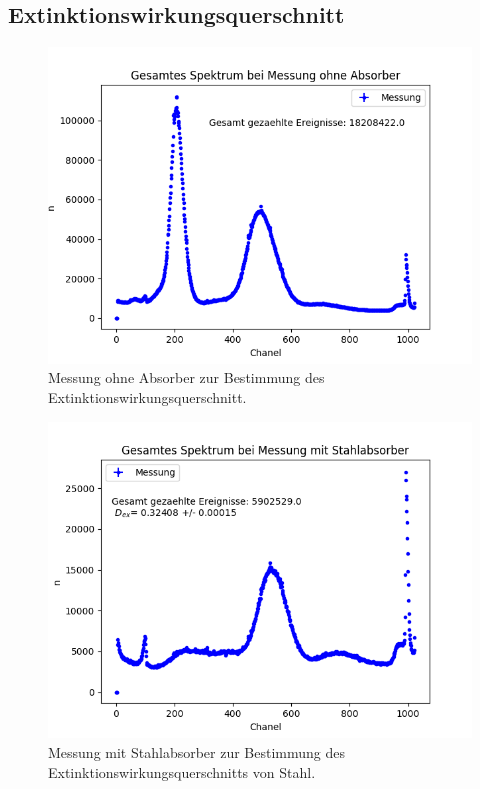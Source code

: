 \documentclass[12pt,a4paper]{article}
\begin{document}
\subsection{Extinktionswirkungsquerschnitt}
\begin{figure}
\centering
\includegraphics[scale=0.8]{Bilder/Extinktion/OhneAbsorber.png}
\caption{Messung ohne Absorber zur Bestimmung des Extinktionswirkungsquerschnitt.}
\label{fig:Extinktion_ohneAbsorber}
\end{figure}

\begin{figure}
\centering
\includegraphics[scale=0.8]{Bilder/Extinktion/Stahl.png}
\caption{Messung mit Stahlabsorber zur Bestimmung des Extinktionswirkungsquerschnitts von Stahl.}
\label{fig:Extinktion_Stahl}
\end{figure}
\end{document}
